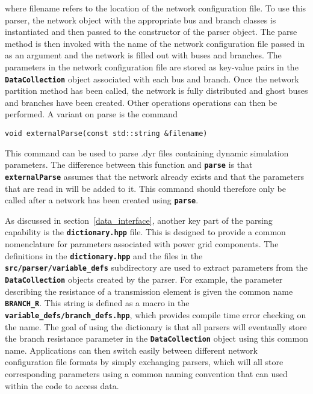where filename refers to the location of the network configuration file. To use
this parser, the network object with the appropriate bus and branch classes is
instantiated and then passed to the constructor of the parser object. The parse method is then invoked with the name of the network configuration file passed in as an argument and the network is filled out with buses and branches. The parameters in the network configuration file are stored as key-value pairs in the \texttt{\textbf{DataCollection}} object associated with each bus and branch. Once the network partition method has been called, the network is fully distributed and ghost buses and branches have been created. Other operations operations can then be performed. A variant on parse is the command

{
\color{red}
\begin{Verbatim}[fontseries=b]
void externalParse(const std::string &filename)
\end{Verbatim}
}

This command can be used to parse .dyr files containing dynamic simulation parameters. The difference between this function and \texttt{\textbf{parse}} is that \texttt{\textbf{externalParse}} assumes that the network already exists and that the parameters that are read in will be added to it. This command should therefore only be called after a network has been created using \texttt{\textbf{parse}}.

As discussed in section~\ref{data_interface}, another key part of the parsing
capability is the \texttt{\textbf{dictionary.hpp}} file. This is designed to provide a common nomenclature for parameters associated with power grid components.
The definitions in the \texttt{\textbf{dictionary.hpp}} and the files in the
\texttt{\textbf{src/parser/variable\_defs}} subdirectory are used to extract
parameters from the\newline
\texttt{\textbf{DataCollection}} objects created by the
parser. For example, the parameter describing the resistance of a transmission
element is given the common name \texttt{\textbf{BRANCH\_R}}. This string is
defined as a macro in the \texttt{\textbf{variable\_defs/branch\_defs.hpp}}, which
provides compile time error checking on the name. The goal of using the dictionary is that all parsers will eventually store the branch resistance parameter in the \texttt{\textbf{DataCollection}} object using this common name. Applications can then switch easily between different network configuration file formats by simply exchanging parsers, which will all store corresponding parameters using a common naming convention that can used within the code to access data.
